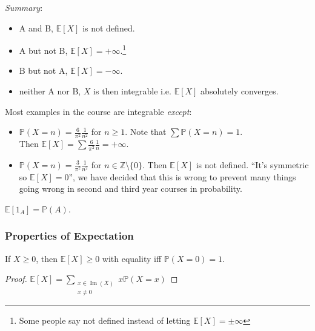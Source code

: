 \color{black}
\emph{Summary}: 
\begin{itemize}
    \item A and B, $\mathbb{E}[X]$ is not defined.
    \item A but not B, $\mathbb{E}[X] = + \infty$.\footnote{Some people say not defined instead of letting $\mathbb{E}[X] =  \pm \infty$}
    \item B but not A, $\mathbb{E}[X] = - \infty$.
    \item neither A nor B, $X$ is then integrable i.e. $\mathbb{E}[X]$ absolutely converges.
\end{itemize} 

\begin{example}
    Most examples in the course are integrable \emph{except}: 
    \begin{itemize}
        \item $\mathbb{P}(X = n) = \frac{6}{\pi^2} \frac{1}{n^2}$ for $n \geq 1$.
        Note that $\sum \mathbb{P}(X = n) = 1$. \\
        Then $\mathbb{E}[X] = \sum \frac{6}{\pi^2} \frac{1}{n} = + \infty$.
        \item $\mathbb{P}(X = n) = \frac{3}{\pi^2} \frac{1}{n^2}$ for $n \in \mathbb{Z} \setminus \{0\}$.
        Then $\mathbb{E}[X]$ is not defined.
        \color{blue} ``It's symmetric so $\mathbb{E}[X] = 0$'', we have decided that this is wrong to prevent many things going wrong in second and third year courses in probability.
    \end{itemize} 
\end{example} 

\begin{example}
    $\mathbb{E}[1_A] = \mathbb{P}(A)$.
\end{example} 

\subsubsection{Properties of Expectation}

\begin{proposition}
    If $X \geq 0$, then $\mathbb{E}[X] \geq 0$ with equality iff $\mathbb{P}(X = 0) = 1$. 
\end{proposition} 

\begin{proof}
    $\displaystyle \mathbb{E}[X] = \sum_{\substack{x \in \operatorname{Im}(X) \\ x \neq 0}} x \mathbb{P}(X = x)$
\end{proof} 

